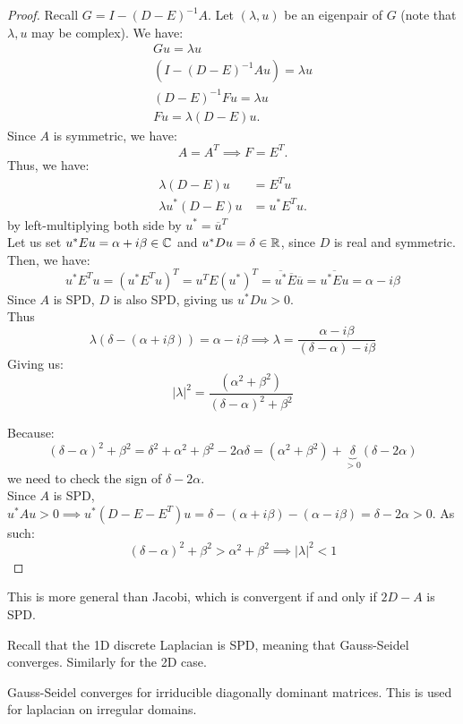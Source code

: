 \documentclass[../main/main.tex]{subfiles}
\begin{document}
\begin{proof}
  Recall $G=I-(D-E)^{-1} A$. Let $(\lambda,u)$ be an eigenpair of $G$ (note that $\lambda,u$ may be complex). We have:
  \begin{align*}
Gu =  \lambda u \\
    (I-(D-E)^{-1}A u) = \lambda u \\
    (D-E)^{-1} F u = \lambda u \\
    Fu = \lambda (D-E) u
    .\end{align*}
  Since $A$ is symmetric, we have: \[
A=A^{T} \implies F = E^{T}
.\] Thus, we have:
\begin{align*}
  \lambda(D-E) u &= E^{T} u \\
\lambda u^{*} (D-E)u&= u^{*}E^{T} u
                                 .\end{align*}
                               by  left-multiplying both side by $u^{*}=\overline{u}^{T}$  \\

                               Let us set $u^{*} E u = \alpha +i \beta \in \mathbb{C}$ and $u^{*}D u = \delta \in \mathbb{R}$, since $D$ is real and symmetric. Then, we have:
                               \[
u^{*}E^{T} u = (u^{*}E^{T} u)^{T} = u^{T} E (u^{*})^{T} = \overline{u^{*}} \overline{E} \overline{u} = \overline{u^{*}E u} = \alpha - i \beta
\]
Since $A$ is SPD,  $D$ is also SPD, giving us $u^{*}D u > 0$. \\

Thus  \[
\lambda(\delta - (\alpha+i\beta)) = \alpha-i\beta \implies \lambda = \frac{\alpha-i\beta}{(\delta-\alpha)-i\beta}
\]Giving us: \[
|\lambda|^2 = \frac{(\alpha^2+\beta^2)}{(\delta-\alpha)^2+\beta^2}
\]

Because: \[
(\delta-\alpha)^2+\beta^2 = \delta^2+\alpha^2+\beta^2 - 2\alpha\delta = (\alpha^2+\beta^2)+\underbrace{\delta}_{>0}(\delta-2\alpha)
\] we need to check the sign of $\delta-2\alpha$. \\

Since $A $ is SPD, $u^{*}Au>0 \implies u^{*}(D-E-E^{T})u = \delta -(\alpha+i\beta) - (\alpha - i\beta) = \delta -2\alpha > 0 $. As such: \[
(\delta - \alpha)^2 +\beta^2 > \alpha^2 +\beta^2 \implies |\lambda|^2 < 1
\]
\end{proof}

\begin{remark}
This is more general than Jacobi, which is convergent if and only if $2D-A$ is SPD.
\end{remark}
\begin{example}
  Recall that the 1D discrete Laplacian is SPD, meaning that Gauss-Seidel converges. Similarly for the 2D case.
\end{example}
\begin{example}
  Gauss-Seidel converges for irriducible diagonally dominant matrices. This is used for laplacian on irregular domains.
\end{example}
\end{document}
